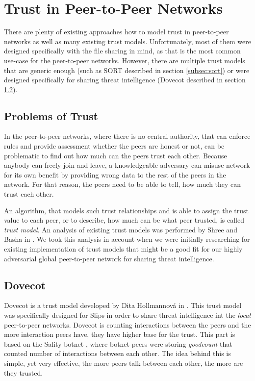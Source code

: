 \section{Trust in Peer-to-Peer Networks}
\label{sec:trust-in-p2p}

There are plenty of existing approaches how to model trust in peer-to-peer networks as well as many existing trust models.
Unfortunately, most of them were designed specifically with the file sharing in mind, as that is the most common use-case for the peer-to-peer networks.
However, there are multiple trust models that are generic enough (such as SORT described in section \ref{subsec:sort}) or were designed specifically for sharing threat intelligence (Dovecot described in section \ref{subsec:dovecot}).

\subsection{Problems of Trust}
\label{subsec:problems-of-trust}
In the peer-to-peer networks, where there is no central authority, that can enforce rules and provide assessment whether the peers are honest or not, can be problematic to find out how much can the peers trust each other.
Because anybody can freely join and leave, a knowledgeable adversary can misuse network for its own benefit by providing wrong data to the rest of the peers in the network.
For that reason, the peers need to be able to tell, how much they can trust each other. 

An algorithm, that models such trust relationships and is able to assign the trust value to each peer, or to describe, how much can be what peer trusted, is called \textit{trust model}.
An analysis of existing trust models was performed by Shree and Basha in \cite{shree2014exhaustive}. 
We took this analysis in account when we were initially researching for existing implementation of trust models that might be a good fit for our highly adversarial global peer-to-peer network for sharing threat intelligence.

\subsection{Dovecot}
\label{subsec:dovecot}
Dovecot is a trust model developed by Dita Hollmannová in \cite{dita}.
This trust model was specifically designed for Slips in order to share threat intelligence int the \textit{local} peer-to-peer networks.
Dovecot is counting interactions between the peers and the more interaction peers have, they have higher base for the trust.
This part is based on the Sality botnet \cite{falliere2011sality}, where botnet peers were storing \textit{goodcount} that counted number of interactions between each other.
The idea behind this is simple, yet very effective, the more peers talk between each other, the more are they trusted.

